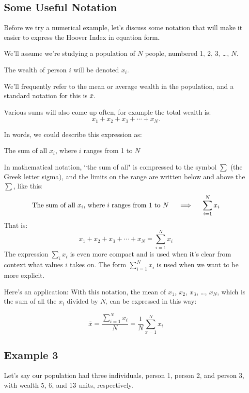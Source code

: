 \documentclass[12pt]{memoir}\usepackage[]{graphicx}\usepackage[table]{xcolor}
\begin{document}
\subsection*{Some Useful Notation}
Before we try a numerical example, let's discuss some notation that will make it 
easier to express the Hoover Index in equation form. 

We'll assume we're studying a population of $N$ people, numbered 1, 2, 3, \ldots, $N$.

The wealth of person $i$ will be denoted $x_i$.  

We'll frequently refer to the mean or average wealth in the population, and a 
standard notation for this is $\bar{x}.$ 

Various sums will also come up often, for example the total wealth is: 
$$x_1 + x_2 + x_3 + \cdots + x_N.$$

In words, we could describe this expression as:

\begin{center}
The sum of all $x_i$, where $i$ ranges from 1 to $N$
\end{center}

In mathematical notation, ``the sum of all" is compressed to the symbol $\sum$ (the Greek letter sigma), 
and the limits on the range are written below and above the $\sum$, like this:
$$\text{The\ sum\ of\ all\ } x_i \text{, where } i \text{ ranges\ from\ 1\ to } N \hspace{0.5cm} \Longrightarrow 
\hspace{0.5cm} \sum_{i = 1}^N x_i$$
That is: 
$$x_1 + x_2 + x_3 + \cdots + x_N = \sum_{i = 1}^N x_i$$
The expression $\displaystyle \sum_i x_i$ is even more compact and is used when 
it's clear from context what values $i$ takes on.  The
form $\displaystyle \sum_{i = 1}^N x_i$ is used when we want to be more explicit.

Here's an application: With this notation, the mean of $x_1$, $x_2$, $x_3$, \ldots, $x_N$, which is 
the sum of all the $x_i$ divided by $N$, can be expressed in this way: 

$$\bar{x} = \dfrac{\sum_{i = 1}^N x_i}{N} = \dfrac{1}{N}\sum_{x = 1}^N x_i$$

\subsection*{Example 3} Let's say our population had three individuals, person 1, 
person 2, and person 3, with wealth 5, 6, and 13 units, respectively.  
\end{document}
